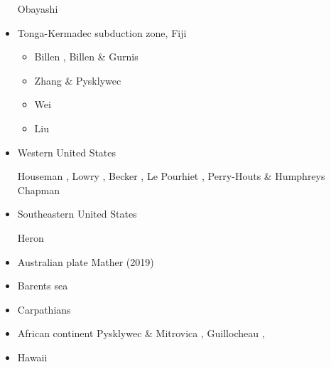 \begin{itemize}
\begin{scriptsize}
\cite{hond85}
\cite{lohd07}
Obayashi \etal \cite{obyf09}\\
\cite{vakn12}
\cite{musi13}
\cite{kigk14}\cite{leli14}\cite{mova14}\cite{hond14}
\cite{kilk15}
\cite{yagz17}
\cite{yamg19}
\cite{mapg20}
\end{scriptsize}

\item{Tonga-Kermadec subduction zone, Fiji} 

\begin{scriptsize}
\begin{itemize}
\item[\twothousandthree] Billen \etal \cite{bigs03}, Billen \& Gurnis \cite{bigu03}
\item[\twothousandsix] Zhang \& Pysklywec \cite{zhpy06}
\item[\twothousandsixteen] Wei \etal \cite{wewv17}
\item[\twothousandtwentyone] Liu \etal \cite{ligl21}
\end{itemize}
\end{scriptsize}

\item{Western United States}


\begin{scriptsize}
Houseman \etal \cite{honk00}, Lowry \etal \cite{lors00},
Becker \etal \cite{besb06}, Le Pourhiet \etal \cite{legs06},
Perry-Houts \& Humphreys \cite{pehu18}
Chapman \cite{chap21}
\end{scriptsize}


\item{Southeastern United States}

\begin{scriptsize}
Heron \etal \cite{heps18}
\end{scriptsize}


\item Australian plate 
{\scriptsize
\cite{himu03}\cite{wemv03}\cite{pymi03}\cite{onml03}
\cite{onmj05}
\cite{hazs10}\cite{dimg10}
\cite{mahg11}\cite{digm11}
\cite{gosk14}
\cite{scsp15}
Mather \etal (2019) \cite{mamr19}
}
\item Barents sea 
{\scriptsize
\cite{buto07b}
\cite{gahs13}
\cite{gahs14}
}
\item Carpathians 
{\scriptsize
\cite{clbm04}
\cite{isms05}
\cite{nehe06}
\cite{sepg19}
}
\item African continent 
{\scriptsize
\cite{gikb94}
Pysklywec \& Mitrovica \cite{pymi99},
\cite{vabt11}
\cite{busm12}
\cite{gagb14}
\cite{wakc17}
Guillocheau \etal \cite{gusb18},
\cite{cels20}
}
\item Hawaii 


\end{itemize}
